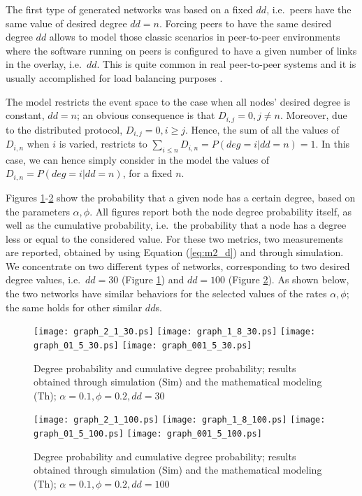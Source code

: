 \documentclass[a4paper,twosided]{article}
\begin{document}
The first type of generated networks was based on a fixed $dd$, i.e.~peers have the same value of desired degree $dd = n$. Forcing peers to have the same desired degree $dd$ allows to model those classic scenarios in peer-to-peer environments where the software running on peers is configured to have a given number of links in the overlay, i.e.~$dd$. This is quite common in real peer-to-peer systems and it is usually accomplished for load balancing purposes \cite{wang}.

The model restricts the event space to the case when all nodes' desired degree is constant, $dd = n$; an obvious consequence is that $D_{i,j} = 0, j\neq n$. Moreover, due to the distributed protocol, $D_{i,j} = 0, i \geq j$. Hence, the sum of all the values of $D_{i,n}$ when $i$ is varied, restricts to $\sum_{i\leq n} D_{i,n} = P(deg =i | dd = n) = 1$. In this case, we can hence simply consider in the model the values of $D_{i,n} = P(deg =i | dd = n)$, for a fixed $n$.



Figures \ref{fig:fig1}-\ref{fig:fig2} show the probability that a given node has a certain degree, based on the parameters $\alpha, \phi$.
All figures report both the node degree probability itself, as well as the cumulative probability, i.e.~the probability that a node has a degree less or equal to the considered value. For these two metrics, two measurements are reported, obtained by using Equation (\ref{eq:m2_d}) and through simulation.
We concentrate on two different types of networks, corresponding to two desired degree values, i.e.~$dd=30$ (Figure \ref{fig:fig1}) and $dd=100$ (Figure \ref{fig:fig2}). 
As shown below, the two networks have similar behaviors for the selected values of the rates $\alpha, \phi$; the same holds for other similar $dd$s.


\begin{figure}[t]
   \centering
   \texttt{[image: graph\_2\_1\_30.ps]}
   \texttt{[image: graph\_1\_8\_30.ps]}
   \texttt{[image: graph\_01\_5\_30.ps]}
   \texttt{[image: graph\_001\_5\_30.ps]}
   \caption{Degree probability and cumulative degree probability; results obtained through simulation (Sim) and the mathematical modeling (Th); $\alpha = 0.1, \phi = 0.2, dd=30$}
   \label{fig:fig1}
\end{figure}

\begin{figure}[t]
   \centering
   \texttt{[image: graph\_2\_1\_100.ps]}
   \texttt{[image: graph\_1\_8\_100.ps]}
   \texttt{[image: graph\_01\_5\_100.ps]}
   \texttt{[image: graph\_001\_5\_100.ps]}
   \caption{Degree probability and cumulative degree probability; results obtained through simulation (Sim) and the mathematical modeling (Th); $\alpha = 0.1, \phi = 0.2, dd=100$}
   \label{fig:fig2}
\end{figure}
\end{document}
